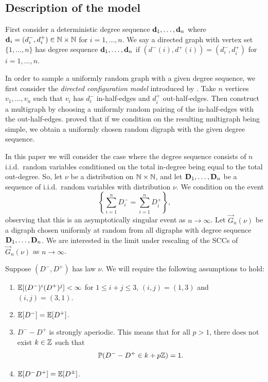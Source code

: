 \subsection{Description of the model}

First consider a deterministic degree sequence ${\mathbf d}_1, \ldots, {\mathbf d}_n$ where ${\mathbf d}_i = (d_i^-, d_i^+)\in {\mathbb N} \times {\mathbb N}$ for $i = 1, \ldots, n$. We say a directed graph with vertex set $\{1,\dots,n\}$ has degree sequence ${\mathbf d}_1, \ldots, {\mathbf d}_n$ if $(d^-(i), d^+(i)) = (d_i^-, d_i^+)$ for $i = 1, \ldots, n$.

In order to sample a uniformly random graph with a given degree sequence, we first consider the \emph{directed configuration model} introduced by \citet{cooperSizeLargestStrongly2004}. Take $n$ vertices $v_1, \ldots, v_n$ such that $v_i$ has $d^-_i$ in-half-edges and $d^+_i$ out-half-edges. Then construct a multigraph by choosing a uniformly random pairing of the in-half-edges with the out-half-edges. \citet{cooperSizeLargestStrongly2004} proved that if we condition on the resulting multigraph being simple, we obtain a uniformly chosen random digraph with the given degree sequence.

In this paper we will consider the case where the degree sequence  consists of $n$ i.i.d.\ random variables conditioned on the total in-degree being equal to the total out-degree. So, let $\nu$ be a distribution on ${\mathbb N} \times {\mathbb N}$, and let ${\mathbf D}_1, \ldots, {\mathbf D}_n$ be a sequence of i.i.d.\ random variables with distribution $\nu$. We condition on the event
\begin{equation*}
    \left\{ \textstyle \sum_{i=1}^n D_i^- = \sum_{i=1}^n D_i^+ \right\},
\end{equation*}
observing that this is an asymptotically singular event as $n\to\infty$. Let $\vec{G}_n(\nu)$ be a digraph chosen uniformly at random from all digraphs with degree sequence ${\mathbf D}_1, \ldots, {\mathbf D}_n$. We are interested in the limit under rescaling of the SCCs of $\vec{G}_n(\nu)$ as $n\to \infty$.

Suppose $(D^-, D^+)$ has law $\nu$. We will require the following assumptions to hold:
\begin{enumerate}
    \item ${\mathbb E}[(D^-)^i(D^+)^j]< \infty$ for $1 \leq i+j\leq 3$, $(i, j) = (1, 3)$ and $(i, j) = (3, 1)$.
    \item ${\mathbb E}[D^-] = {\mathbb E}[D^+]$.
    \item $D^- - D^+$ is strongly aperiodic. This means that for all $p > 1$, there does not exist $k \in {\mathbb Z}$ such that 
    \begin{equation*}
        {\mathbb P}(D^- - D^+ \in k + p{\mathbb Z}) = 1.
    \end{equation*}
    \item ${\mathbb E}[D^-D^+] = {\mathbb E}[D^{\pm}]$.
\end{enumerate}

